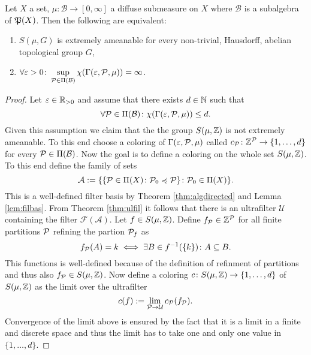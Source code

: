 \begin{thm}\label{thm:colve}
  Let $X$ a set, $\mu\colon \mathcal{B} \to [0, \infty]$ a diffuse submeasure on $X$ where $\mathcal{B}$ is a subalgebra of $\PowS(X)$. Then the following are equivalent:
  \begin{enumerate}
    \item $S(\mu, G)$ is extremely ameanable for every non-trivial, Hausdorff, abelian topological group $G$,
    \item $\forall \varepsilon > 0\colon \sup\limits_{\P \in \Pi(\mathcal{B})}\chi(\Gamma(\varepsilon, \mathcal{P}, \mu)) = \infty$.
  \end{enumerate}
\end{thm}

\begin{proof}
  Let $\varepsilon \in \R_{>0}$ and assume that there exists $d \in \N$ such that
  \begin{equation*}
    \forall \P \in \Pi(\mathcal{B})\colon \chi(\Gamma(\varepsilon, {\P}, \mu)) \leq d. 
  \end{equation*}
  Given this assumption we claim that the the group $S(\mu, \Z)$ is not extremely ameanable. To this end choose a coloring of $\Gamma(\varepsilon, \P, \mu)$ called $c_{\P}\colon \Z^{\P} \to \{1, \ldots, d\}$ for every $\P \in \Pi(\mathcal{B})$. Now the goal is to define a coloring on the whole set $S(\mu, \Z)$. To this end define the family of sets
  \begin{equation*}
    \mathcal{A} := \{\{ \P \in \Pi(X)\colon \P_0 \preccurlyeq \P\}\colon \P_0 \in \Pi(X)\}.
  \end{equation*}
  This is a well-defined filter basis by Theorem \ref{thm:algdirected} and Lemma \ref{lem:filbas}. From Theorem \ref{thm:ulfil} it follows that there is an ultrafilter $\mathcal{U}$ containing the filter $\mathcal{F}(\mathcal{A})$.
 Let $f \in S(\mu, \Z)$. Define $f_\P \in \Z^\P$ for all finite partitions $\P$ refining the partion $\P_f$ as
  \begin{equation*}
    f_\P(A) = k \iff \exists B \in f^{-1}(\{k\})\colon A \subseteq B. 
  \end{equation*}
  This functions is well-defined because of the definition of refinment of partitions and thus also $f_\P \in S(\mu, \Z)$.
  Now define a coloring $c\colon S(\mu, \Z) \to \{1, \ldots, d\}$ of $S(\mu, \Z)$ as the limit over the ultrafilter
  \begin{equation*}
    c(f) := \lim\limits_{\P \to \mathcal{U}} c_{\P}(f_\P).
  \end{equation*}
  Convergence of the limit above is ensured by the fact that it is a limit in a finite and discrete space and thus the limit has to take one and only one value in $\{1, \ldots, d\}$.
  

\end{proof}
